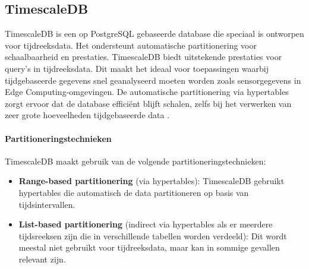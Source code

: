 \subsection{TimescaleDB}

TimescaleDB is een op PostgreSQL gebaseerde database die speciaal is ontworpen voor tijdreeksdata. Het ondersteunt automatische partitionering voor schaalbaarheid en prestaties. TimescaleDB biedt uitstekende prestaties voor query's in tijdreeksdata. Dit maakt het ideaal voor toepassingen waarbij tijdgebaseerde gegevens snel geanalyseerd moeten worden zoals sensorgegevens in Edge Computing-omgevingen. De automatische partitionering via hypertables zorgt ervoor dat de database efficiënt blijft schalen, zelfs bij het verwerken van zeer grote hoeveelheden tijdgebaseerde data \autocite{TimescaleDBDocumentation}.

\paragraph{Partitioneringstechnieken}  
TimescaleDB maakt gebruik van de volgende partitioneringstechnieken:
\begin{itemize}
    \item \textbf{Range-based partitionering} (via hypertables): TimescaleDB gebruikt hypertables die automatisch de data partitioneren op basis van tijdsintervallen.
    \item \textbf{List-based partitionering} (indirect via hypertables als er meerdere tijdsreeksen zijn die in verschillende tabellen worden verdeeld): Dit wordt meestal niet gebruikt voor tijdreeksdata, maar kan in sommige gevallen relevant zijn.
\end{itemize}

\begin{table}[h]
    \centering
    \caption{Overzicht van de specificaties van TimescaleDB. \cite{TimescaleDBDocumentation}}
\end{table}


